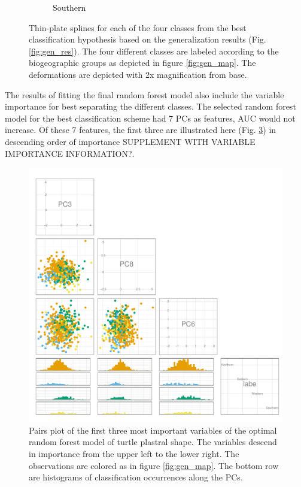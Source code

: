 \documentclass[12pt,letterpaper]{article}\usepackage{graphicx, color}
\begin{document}
\begin{figure}[ht]
\begin{subfigure}[b]{0.4\textwidth}
    \caption{Southern}
    \label{fig:mean_shape4}
  \end{subfigure}
  \caption{Thin-plate splines for each of the four classes from the best classification hypothesis based on the generalization results (Fig. \ref{fig:gen_res}). The four different classes are labeled according to the biogeographic groups as depicted in figure \ref{fig:gen_map}. The deformations are depicted with 2x magnification from base.}
  \label{fig:mean_shape}
\end{figure}


The results of fitting the final random forest model also include the variable importance for best separating the different classes. The selected random forest model for the best classification scheme had 7 PCs as features, AUC would not increase. Of these 7 features, the first three are illustrated here (Fig. \ref{fig:imp_pc}) in descending order of importance SUPPLEMENT WITH VARIABLE IMPORTANCE INFORMATION?. 

\begin{figure}[ht]
  \centering
  \includegraphics[width = \textwidth]{figure/pca_imp}
  \caption{Pairs plot of the first three most important variables of the optimal random forest model of turtle plastral shape. The variables descend in importance from the upper left to the lower right. The observations are colored as in figure \ref{fig:gen_map}.  The bottom row are histograms of classification occurrences along the PCs.}
  \label{fig:imp_pc}
\end{figure}
\end{document}
